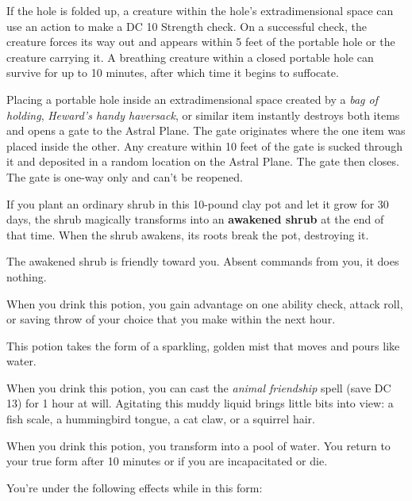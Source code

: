 \documentclass[10pt,a4paper,twoside,bg=print,twocolumn,openany,nodeprecatedcode]{dndbook}
\begin{document}
If the hole is folded up, a creature within the hole's extradimensional space can use an action to make a DC 10 Strength check. On a successful check, the creature forces its way out and appears within 5 feet of the portable hole or the creature carrying it. A breathing creature within a closed portable hole can survive for up to 10 minutes, after which time it begins to suffocate.

Placing a portable hole inside an extradimensional space created by a \textit{bag of holding}, \textit{Heward's handy haversack}, or similar item instantly destroys both items and opens a gate to the Astral Plane. The gate originates where the one item was placed inside the other. Any creature within 10 feet of the gate is sucked through it and deposited in a random location on the Astral Plane. The gate then closes. The gate is one-way only and can't be reopened.

If you plant an ordinary shrub in this 10-pound clay pot and let it grow for 30 days, the shrub magically transforms into an \textbf{awakened shrub} at the end of that time. When the shrub awakens, its roots break the pot, destroying it.

The awakened shrub is friendly toward you. Absent commands from you, it does nothing.

When you drink this potion, you gain advantage on one ability check, attack roll, or saving throw of your choice that you make within the next hour.

This potion takes the form of a sparkling, golden mist that moves and pours like water.

When you drink this potion, you can cast the \textit{animal friendship} spell (save DC 13) for 1 hour at will. Agitating this muddy liquid brings little bits into view: a fish scale, a hummingbird tongue, a cat claw, or a squirrel hair.

When you drink this potion, you transform into a pool of water. You return to your true form after 10 minutes or if you are incapacitated or die.

You're under the following effects while in this form:
\end{document}

